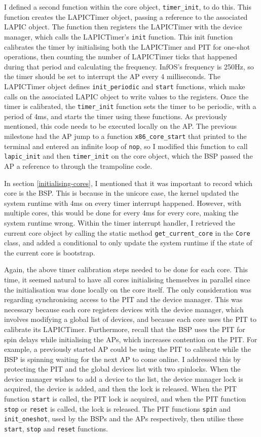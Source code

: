 \documentclass[bsc,frontabs,singlespacing,parskip,deptreport]{infthesis}
\begin{document}
I defined a second function within the core object, \verb|timer_init|, to do this. This function creates the LAPICTimer object, passing a reference to the associated LAPIC object. The function then registers the LAPICTimer with the device manager, which calls the LAPICTimer's \verb|init| function. This init function calibrates the timer by initialising both the LAPICTimer and PIT for one-shot operations, then counting the number of LAPICTimer ticks that happened during that period and calculating the frequency. InfOS's frequency is 250Hz, so the timer should be set to interrupt the AP every 4 milliseconds. The LAPICTimer object defines \verb|init_periodic| and \verb|start| functions, which make calls on the associated LAPIC object to write values to the registers. Once the timer is calibrated, the \verb|timer_init| function sets the timer to be periodic, with a period of 4ms, and starts the timer using these functions. As previously mentioned, this code needs to be executed locally on the AP. The previous milestone had the AP jump to a function \verb|x86_core_start| that printed to the terminal and entered an infinite loop of \verb|nop|, so I modified this function to call \verb|lapic_init| and then \verb|timer_init| on the core object, which the BSP passed the AP a reference to through the trampoline code.

In section \ref{initialising-cores}, I mentioned that it was important to record which core is the BSP. This is because in the unicore case, the kernel updated the system runtime with 4ms on every timer interrupt happened. However, with multiple cores, this would be done for every 4ms for every core, making the system runtime wrong. Within the timer interrupt handler, I retrieved the current core object by calling the static method \verb|get_current_core| in the \verb|Core| class, and added a conditional to only update the system runtime if the state of the current core is bootstrap.

Again, the above timer calibration steps needed to be done for each core. This time, it seemed natural to have all cores initialising themselves in parallel since the initialisation was done locally on the core itself. The only consideration was regarding synchronising access to the PIT and the device manager. This was necessary because each core registers devices with the device manager, which involves modifying a global list of devices, and because each core uses the PIT to calibrate its LAPICTimer. Furthermore, recall that the BSP uses the PIT for spin delays while initialising the APs, which increases contention on the PIT. For example, a previously started AP could be using the PIT to calibrate while the BSP is spinning waiting for the next AP to come online. I addressed this by protecting the PIT and the global devices list with two spinlocks. When the device manager wishes to add a device to the list, the device manager lock is acquired, the device is added, and then the lock is released. When the PIT function \verb|start| is called, the PIT lock is acquired, and when the PIT function \verb|stop| or \verb|reset| is called, the lock is released. The PIT functions \verb|spin| and \verb|init_oneshot|, used by the BSPs and the APs respectively, then utilise these \verb|start|, \verb|stop| and \verb|reset| functions.
\end{document}
